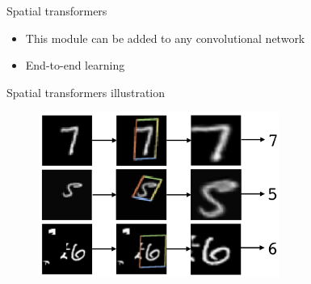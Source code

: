 \documentclass[xcolor=pdftex,dvipsnames,table,mathserif]{beamer}
\begin{document}
\begin{frame}{Spatial transformers~\cite{jaderberg_spatial_2016}}
\pause

  \vspace{1cm}

  \begin{block}{}
    \begin{itemize}
    \item This module can be added to any convolutional network
    \item End-to-end learning
    \end{itemize}


  \end{block}



\end{frame}

\begin{frame}{Spatial transformers illustration}

  \begin{figure}[ht]
    \centering
    \includegraphics[width=0.7\textwidth]{spatial_transformer_res}
  \end{figure}
\end{frame}
\end{document}
